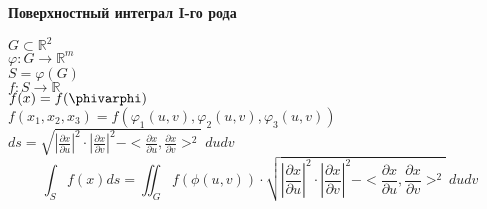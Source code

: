     \begin{center}
        \textbf{Поверхностный интеграл I-го рода}
    \end{center}
    $G \subset \mathbb{R}^2$\\
    $\varphi: G \rightarrow \mathbb{R}^m$\\
    $S = \varphi(G)$\\
    $f: S \rightarrow \mathbb{R}$\\
    $f(x) = f(\phivarphi)$\\
    $f(x_1, x_2, x_3) = f(\varphi_1(u, v), \varphi_2(u, v), \varphi_3(u, v))$\\
    $ds = \sqrt{|\frac{\partial x}{\partial u}|^2 \cdot |\frac{\partial x}{\partial v}|^2 - <\frac{\partial x}{\partial u}, \frac{\partial x}{\partial v}>^2}\ dudv$
    $$\int_S f(x) ds = \iint_G f(\phi(u, v)) \cdot \sqrt{|\frac{\partial x}{\partial u}|^2 \cdot |\frac{\partial x}{\partial v}|^2 - <\frac{\partial x}{\partial u}, \frac{\partial x}{\partial v}>^2}\ dudv$$
